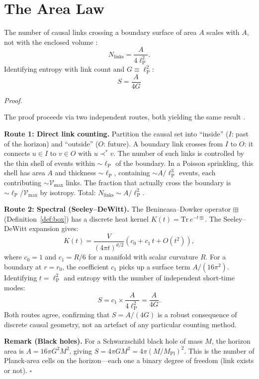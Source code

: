 \documentclass[11pt, a4paper, openany]{book}
\newcommand{\lP}{\ell_{\mathrm{P}}}
\newcommand{\MPl}{M_{\mathrm{Pl}}}
\newcommand{\covers}{\prec^*}              %
\newcommand{\boxlayer}{\boxplus}            %
\newcounter{thm}[chapter]
\renewenvironment{proof}[1][Proof]{%
  \par\noindent\textit{#1.}\quad
}{\hfill$\square$\par\medskip}
\begin{document}
\section{The Area Law}

\begin{theorem}\label{thm:area-law}
The number of causal links crossing a boundary surface of area $A$
scales with $A$, not with the enclosed volume \cite{dou2003}:
\begin{equation}
  N_{\mathrm{links}} = \frac{A}{4\lP^2}.
\end{equation}
Identifying entropy with link count and $G \equiv \lP^2$:
\begin{equation}
  \boxed{S = \frac{A}{4G}}
\end{equation}
\end{theorem}

\begin{proof}
The proof proceeds via two independent routes, both yielding the same
result \cite{dou2003}.

\textbf{Route 1: Direct link counting.} Partition the causal set into
``inside'' ($I$: past of the horizon) and ``outside'' ($O$: future).
A boundary link crosses from $I$ to $O$: it connects $u \in I$ to
$v \in O$ with $u \covers v$. The number of such links is controlled by
the thin shell of events within $\sim \lP$ of the boundary. In a Poisson
sprinkling, this shell has area $A$ and thickness $\sim \lP$, containing
$\sim A/\lP^3$ events, each contributing $\sim \mathcal{V}_{\max}$ links. The
fraction that actually cross the boundary is $\sim \lP/\mathcal{V}_{\max}$ by
isotropy. Total: $N_{\mathrm{links}} \sim A/\lP^2$.

\textbf{Route 2: Spectral (Seeley--DeWitt).} The Benincasa--Dowker
operator $\boxlayer$ (Definition~\ref{def:box}) has a discrete heat
kernel $K(t) = \mathrm{Tr}\,e^{-t\boxlayer}$. The Seeley--DeWitt
expansion gives:
\[
  K(t) = \frac{V}{(4\pi t)^{d/2}}\left(c_0 + c_1\,t + O(t^2)\right),
\]
where $c_0 = 1$ and $c_1 = R/6$ for a manifold with scalar curvature
$R$. For a boundary at $r = r_0$, the coefficient $c_1$ picks up a
surface term $A/(16\pi^2)$. Identifying $t = \lP^2$ and entropy with
the number of independent short-time modes:
\[
  S = c_1 \times \frac{A}{4\lP^2} = \frac{A}{4G}.
\]
Both routes agree, confirming that $S = A/(4G)$ is a robust consequence
of discrete causal geometry, not an artefact of any particular counting
method.

\textbf{Remark (Black holes).} For a Schwarzschild black hole of mass
$M$, the horizon area is $A = 16\pi G^2 M^2$, giving
$S = 4\pi G M^2 = 4\pi (M/\MPl)^2$. This is the number of Planck-area
cells on the horizon---each one a binary degree of freedom (link exists
or not).
\end{proof}
\end{document}
